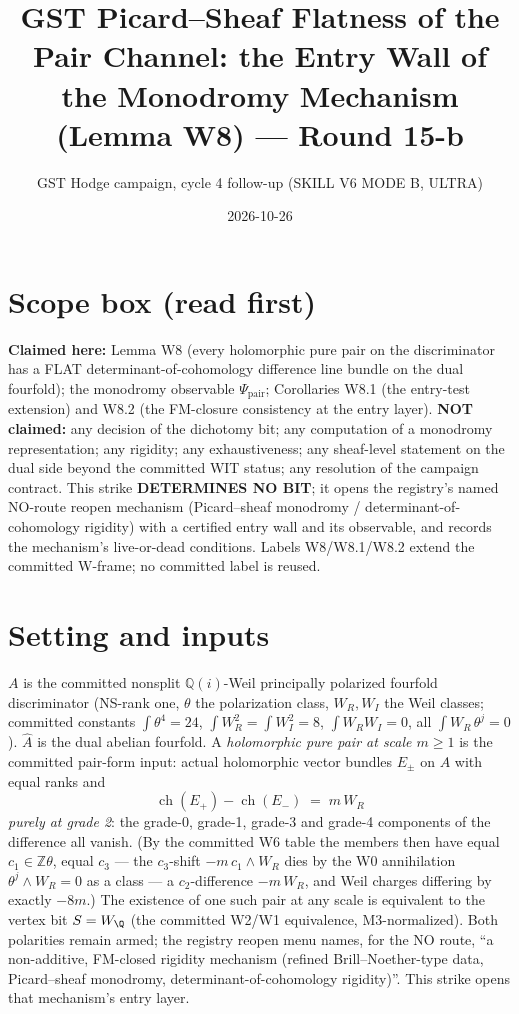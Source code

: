 \documentclass[11pt]{article}
\title{GST Picard--Sheaf Flatness of the Pair Channel: the Entry Wall of the
Monodromy Mechanism (Lemma W8) --- Round 15-b}
\author{GST Hodge campaign, cycle 4 follow-up (SKILL V6 MODE B, ULTRA)}
\date{2026-10-26}
\newcommand{\WR}{W_R}
\newcommand{\WI}{W_I}
\newcommand{\ch}{\operatorname{ch}}
\newcommand{\KA}{A}
\newcommand{\KAd}{\widehat{A}}
\begin{document}
\maketitle

\section*{Scope box (read first)}

\textbf{Claimed here:} Lemma W8 (every holomorphic pure pair on the
discriminator has a FLAT determinant-of-cohomology difference line bundle on
the dual fourfold); the monodromy observable $\Psi_{\mathrm{pair}}$;
Corollaries W8.1 (the entry-test extension) and W8.2 (the FM-closure
consistency at the entry layer). \textbf{NOT claimed:} any decision of the
dichotomy bit; any computation of a monodromy representation; any rigidity;
any exhaustiveness; any sheaf-level statement on the dual side beyond the
committed WIT status; any resolution of the campaign contract. This strike
\textbf{DETERMINES NO BIT}; it opens the registry's named NO-route reopen
mechanism (Picard--sheaf monodromy / determinant-of-cohomology rigidity) with
a certified entry wall and its observable, and records the mechanism's live-or-dead
conditions. Labels W8/W8.1/W8.2 extend the committed W-frame; no committed
label is reused.

\section{Setting and inputs}

$\KA$ is the committed nonsplit $\mathbb{Q}(i)$-Weil principally polarized
fourfold discriminator (NS-rank one, $\theta$ the polarization class,
$\WR,\WI$ the Weil classes; committed constants
$\int\theta^4=24$, $\int \WR^2 = \int \WI^2 = 8$, $\int \WR\WI = 0$, all
$\int \WR\,\theta^j = 0$). $\KAd$ is the dual abelian fourfold.
A \emph{holomorphic pure pair at scale $m\ge 1$} is the committed
pair-form input: actual holomorphic vector bundles $E_\pm$ on $\KA$ with
equal ranks and
\[
\ch(E_+) - \ch(E_-) \;=\; m\,\WR
\]
\emph{purely at grade 2}: the grade-0, grade-1, grade-3 and grade-4
components of the difference all vanish. (By the committed W6 table the
members then have equal $c_1 \in \mathbb{Z}\theta$, equal $c_3$ --- the
$c_3$-shift $-m\,c_1\wedge \WR$ dies by the W0 annihilation
$\theta^j \wedge \WR = 0$ as a class --- a $c_2$-difference $-m\,\WR$,
and Weil charges differing by exactly $-8m$.) The existence of one such
pair at any scale is equivalent to the vertex bit $S = W_\Q$ (the committed
W2/W1 equivalence, M3-normalized). Both polarities remain armed; the
registry reopen menu names, for the NO route, ``a non-additive, FM-closed
rigidity mechanism (refined Brill--Noether-type data, Picard--sheaf
monodromy, determinant-of-cohomology rigidity)''. This strike opens that
mechanism's entry layer.
\end{document}

